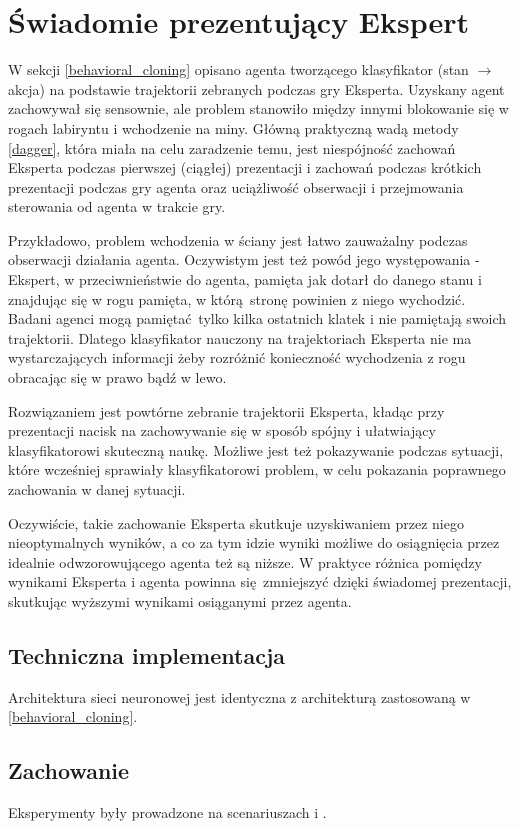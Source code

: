\section{Świadomie prezentujący Ekspert}\label{presenting_expert}
W sekcji \ref{behavioral_cloning} opisano agenta tworzącego klasyfikator (stan $\to$ akcja) na podstawie trajektorii zebranych podczas gry Eksperta. Uzyskany agent zachowywał się sensownie, ale problem stanowiło między innymi blokowanie się w rogach labiryntu i wchodzenie na miny. Główną praktyczną wadą metody \ref{dagger}, która miała na celu zaradzenie temu, jest niespójność zachowań Eksperta podczas pierwszej (ciągłej) prezentacji i zachowań podczas krótkich prezentacji podczas gry agenta oraz uciążliwość obserwacji i przejmowania sterowania od agenta w trakcie gry.

Przykładowo, problem wchodzenia w ściany jest łatwo zauważalny podczas obserwacji działania agenta. Oczywistym jest też powód jego występowania - Ekspert, w przeciwnieństwie do agenta, pamięta jak dotarł do danego stanu i znajdując się w rogu pamięta, w którą stronę powinien z niego wychodzić. Badani agenci mogą pamiętać tylko kilka ostatnich klatek i nie pamiętają swoich trajektorii. Dlatego klasyfikator nauczony na trajektoriach Eksperta nie ma wystarczających informacji żeby rozróżnić konieczność wychodzenia z rogu obracając się w prawo bądź w lewo.

Rozwiązaniem jest powtórne zebranie trajektorii Eksperta, kładąc przy prezentacji nacisk na zachowywanie się w sposób spójny i ułatwiający klasyfikatorowi skuteczną naukę. Możliwe jest też pokazywanie podczas sytuacji, które wcześniej sprawiały klasyfikatorowi problem, w celu pokazania poprawnego zachowania w danej sytuacji.

Oczywiście, takie zachowanie Eksperta skutkuje uzyskiwaniem przez niego nieoptymalnych wyników, a co za tym idzie wyniki możliwe do osiągnięcia przez idealnie odwzorowującego agenta też są niższe. W praktyce różnica pomiędzy wynikami Eksperta i agenta powinna się zmniejszyć dzięki świadomej prezentacji, skutkując wyższymi wynikami osiąganymi przez agenta.

\subsection{Techniczna implementacja}

Architektura sieci neuronowej jest identyczna z architekturą zastosowaną w \ref{behavioral_cloning}.

\subsection{Zachowanie}
Eksperymenty były prowadzone na scenariuszach  i .

